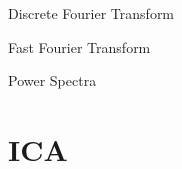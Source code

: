 \begin{compactitem}
\item {Discrete Fourier Transform}

\item {Fast Fourier Transform}

\item {Power Spectra}

\end{compactitem}


\section{ICA}

